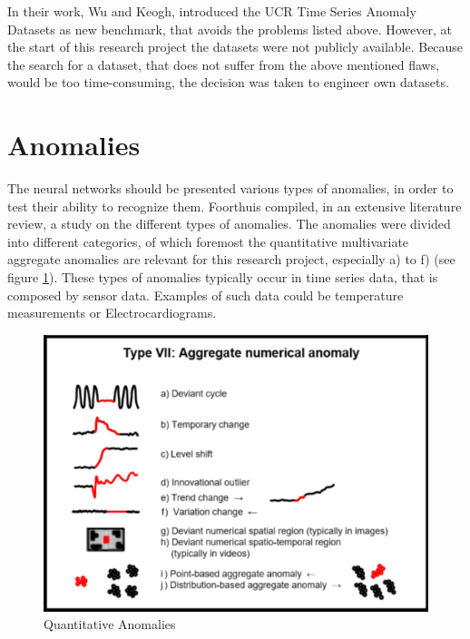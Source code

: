 In their work, Wu and Keogh, introduced the UCR Time Series Anomaly Datasets as new benchmark, that avoids the problems listed above. However, at the start of this research project the datasets were not publicly available. Because the search for a dataset, that does not suffer from the above mentioned flaws, would be too time-consuming, the decision was taken to engineer own datasets.
\newline

\section{Anomalies}
The neural networks should be presented various types of anomalies, in order to test their ability to recognize them. Foorthuis \parencite{YEAR} compiled, in an extensive literature review, a study on the different types of anomalies. The anomalies were divided into different categories, of which foremost the quantitative multivariate aggregate anomalies are relevant for this research project, especially a) to f) (see figure \ref{fig:Anomaly_types}). These types of anomalies typically occur in time series data, that is composed by sensor data. Examples of such data could be temperature measurements or Electrocardiograms.

\begin{figure}[h]
	\centering
	\includegraphics[scale=0.6]{Figures/series_anomaly}
	\decoRule
	\caption[Quantitative Anomalies]{Quantitative Anomalies \parencite{Foorthuis}}
	\label{fig:Anomaly_types}
\end{figure}


